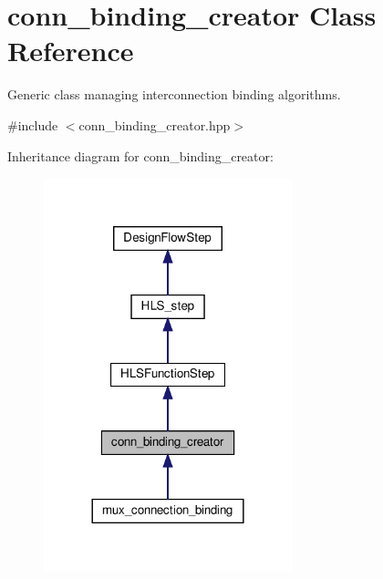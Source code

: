\hypertarget{classconn__binding__creator}{}\section{conn\+\_\+binding\+\_\+creator Class Reference}
\label{classconn__binding__creator}


Generic class managing interconnection binding algorithms.  




{\ttfamily \#include $<$conn\+\_\+binding\+\_\+creator.\+hpp$>$}



Inheritance diagram for conn\+\_\+binding\+\_\+creator\+:
\nopagebreak
\begin{figure}[H]
\begin{center}
\leavevmode
\includegraphics[width=204pt]{d9/d34/classconn__binding__creator__inherit__graph}
\end{center}
\end{figure}


